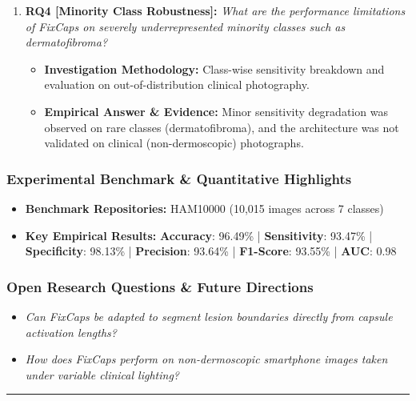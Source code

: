 \begin{enumerate}[label=\textbf{\arabic*.}, leftmargin=*]
\begin{itemize}[leftmargin=1.5em]
  \end{itemize}
  \item \textbf{RQ4 [Minority Class Robustness]:} \textit{What are the performance limitations of FixCaps on severely underrepresented minority classes such as dermatofibroma?}
  \begin{itemize}[leftmargin=1.5em]
    \item \textbf{Investigation Methodology:} Class-wise sensitivity breakdown and evaluation on out-of-distribution clinical photography.
    \item \textbf{Empirical Answer \& Evidence:} Minor sensitivity degradation was observed on rare classes (dermatofibroma), and the architecture was not validated on clinical (non-dermoscopic) photographs.
  \end{itemize}
\end{enumerate}

\subsubsection*{Experimental Benchmark \& Quantitative Highlights}
\begin{itemize}[leftmargin=*]
  \item \textbf{Benchmark Repositories:} HAM10000 (10,015 images across 7 classes)
  \item \textbf{Key Empirical Results:} \textbf{Accuracy}: 96.49\% \quad | \quad \textbf{Sensitivity}: 93.47\% \quad | \quad \textbf{Specificity}: 98.13\% \quad | \quad \textbf{Precision}: 93.64\% \quad | \quad \textbf{F1-Score}: 93.55\% \quad | \quad \textbf{AUC}: 0.98
\end{itemize}

\subsubsection*{Open Research Questions \& Future Directions}
\begin{itemize}[leftmargin=*]
  \item \textit{Can FixCaps be adapted to segment lesion boundaries directly from capsule activation lengths?}
  \item \textit{How does FixCaps perform on non-dermoscopic smartphone images taken under variable clinical lighting?}
\end{itemize}
\vspace{0.8em}\hrule\vspace{1.2em}
